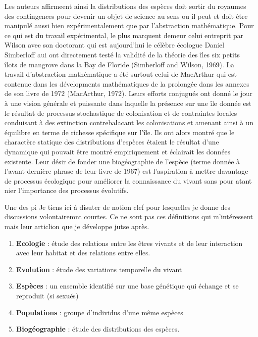Les auteurs affirmeent ainsi la distributions des espèces doit sortir du
royaumes des contingences pour devenir un objet de science au sens ou il
peut et doit être manipulé aussi bien expérimentalement que par
l'abstraction mathématique. Pour ce qui est du travail expérimental, le
plus marquent demeur celui entreprit par Wilson avec son doctorant qui
est aujourd'hui le célèbre écologue Daniel Simberloff aui ont
directement testé la validité de la théorie des îles six petits îlots de
mangrove dans la Bay de Floride (Simberloff and Wilson, 1969). La
travail d'abstraction mathématique a été surtout celui de MacArthur qui
est contenue dans les dévelopments mathématiques de la prolongée dans
les annexes de son livre de 1972 (MacArthur, 1972). Leurs efforts
conjugués ont donné le jour à une vision générale et puissante dans
laquelle la présence sur une île donnée est le résultat de processus
stochastique de colonisation et de contraintes locales conduisant à des
extinction contrebalacant les colonisations et amenant ainsi à un
équilibre en terme de richesse spécifique sur l'île. Ils ont alors
montré que le charactère statique des distributions d'espèces étaient le
résultat d'une dynamique qui pouvait être montré empiriquement et
éclairait les données existente. Leur désir de fonder une biogéographie
de l'espèce (terme donnée à l'avant-dernière phrase de leur livre de
1967) est l'aspiration à mettre davantage de processus écologique pour
améliorer la connaissance du vivant sans pour atant nier l'importance
des processus évolutifs.

Une des pi Je tiens ici à disuter de notion clef pour lesquelles je
donne des discussions volontairemnt courtes. Ce ne sont pas ces
définitions qui m'intéressent mais leur articlion que je développe jutse
après.

\begin{enumerate}
\def\labelenumi{\arabic{enumi}.}
\item
  \textbf{Ecologie} : étude des relations entre les êtres vivants et de
  leur interaction avec leur habitat et des relations entre elles.
\item
  \textbf{Evolution} : étude des variations temporelle du vivant
\item
  \textbf{Espèces} : un ensemble identifié sur une base génétique qui
  échange et se reproduit (si sexués)
\item
  \textbf{Populations} : groupe d'individus d'une même espèces
\item
  \textbf{Biogéographie} : étude des distributions des espèces.
\end{enumerate}

